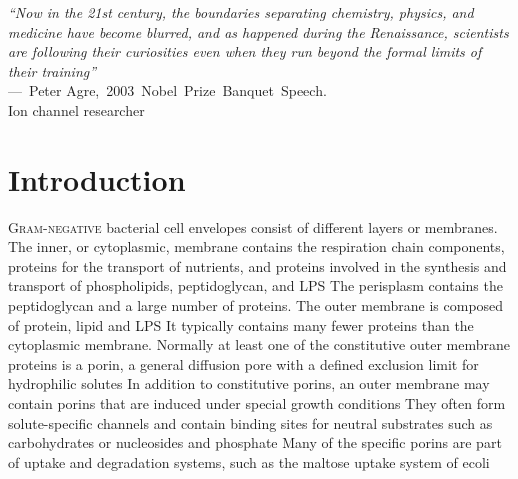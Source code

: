\acresetall
{}
\begin{epigraph}
\emph{``Now in the 21st century, the boundaries separating chemistry, physics, and medicine have become blurred, and as happened during the Renaissance, scientists are following their curiosities even when they run beyond the formal limits of their training''}\\---~Peter Agre,~2003~Nobel~Prize~Banquet~Speech.\\  Ion channel researcher
\end{epigraph}

\section{Introduction} %
\label{sec:porin_introduction} 
\lettrine[lines=2]{G}{ram-negative} bacterial cell envelopes consist of
different layers or membranes. The inner, or cytoplasmic, membrane contains the
respiration chain components, proteins for the transport of nutrients, and
proteins involved in the synthesis and transport of phospholipids, peptidoglycan, and \ac{LPS}  The perisplasm contains the peptidoglycan and a large number of proteins. The outer membrane is composed of protein, lipid and \ac{LPS} It typically contains many  fewer proteins than the cytoplasmic membrane. Normally at least one of the constitutive outer membrane proteins is a porin, a general diffusion pore with a defined exclusion limit for hydrophilic solutes In addition to constitutive porins, an outer membrane may contain porins that are induced under special growth conditions They often form solute-specific channels and contain binding sites for neutral substrates such as carbohydrates or nucleosides and phosphate Many of the specific porins are part of uptake and degradation systems, such as the maltose uptake system of \acl{ecoli} 

